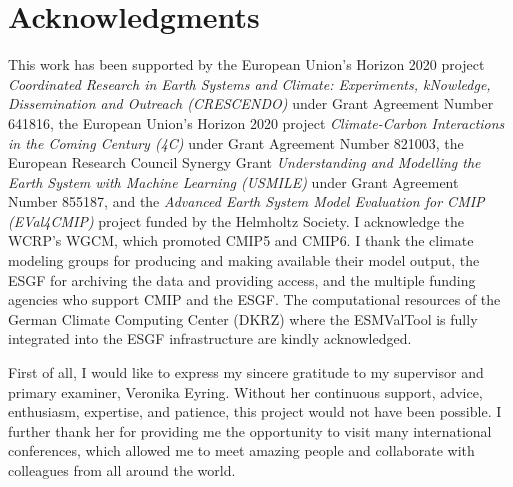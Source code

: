 
%



\chapter{Acknowledgments}

This work has been supported by the European Union's Horizon 2020 project
\emph{Coordinated Research in Earth Systems and Climate: Experiments,
  kNowledge, Dissemination and Outreach (CRESCENDO)} under Grant Agreement
Number 641816, the European Union's Horizon 2020 project \emph{Climate-Carbon
  Interactions in the Coming Century (4C)} under Grant Agreement Number 821003,
the European Research Council Synergy Grant \emph{Understanding and Modelling
  the Earth System with Machine Learning (USMILE)} under Grant Agreement Number
855187, and the \emph{Advanced Earth System Model Evaluation for CMIP
  (EVal4CMIP)} project funded by the Helmholtz Society. I acknowledge the
\ac{WCRP}'s \ac{WGCM}, which promoted \acs{CMIP}5 and \acs{CMIP}6. I thank the
climate modeling groups for producing and making available their model output,
the \ac{ESGF} for archiving the data and providing access, and the multiple
funding agencies who support \ac{CMIP} and the \ac{ESGF}. The computational
resources of the German Climate Computing Center (DKRZ) where the
\ac{ESMValTool} is fully integrated into the \ac{ESGF} infrastructure are
kindly acknowledged.

\vspace{\baselineskip}

First of all, I would like to express my sincere gratitude to my supervisor and
primary examiner, \Prof{} \Dr{} Veronika Eyring. Without her continuous
support, advice, enthusiasm, expertise, and patience, this \PhD{} project would
not have been possible. I further thank her for providing me the opportunity to
visit many international conferences, which allowed me to meet amazing people
and collaborate with colleagues from all around the world.

